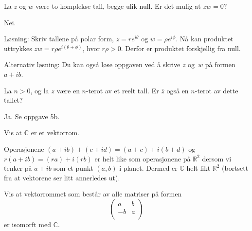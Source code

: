 \begin{oppgave}
La $z$ og $w$ være to komplekse tall, begge ulik null. Er det mulig at $zw=0$?
\end{oppgave}

\begin{losning}
Nei.

\noindent
Løsning: Skriv tallene på polar form, $z=re^{i\theta}$ og $w=\rho e^{i\phi}$. Nå kan produktet uttrykkes $zw=r\rho e^{i(\theta+\phi)}$, hvor $r \rho>0$. Derfor er produktet forskjellig fra null.

\noindent
Alternativ løsning: Du kan også løse oppgaven ved å skrive $z$ og~$w$ på formen $a+ib$.
\end{losning}



\begin{oppgave}
La $n>0$, og la $z$ være en $n$-terot av et reelt tall. Er $\bar{z}$ også en $n$-terot av dette tallet?
\end{oppgave}

\begin{losning}
Ja. Se oppgave 5b.

\end{losning}

\begin{oppgave}
Vis at $\mathbb C$ er et vektorrom.
\end{oppgave}

\begin{losning}
Operasjonene $(a+ib)+(c+id)=(a+c)+i(b+d)$ og $r(a+ib)=(ra)+i(rb)$ er helt like som operasjonene på $\mathbb{R}^2$ dersom vi tenker på $a+ib$ som et punkt $(a,b)$ i planet. Dermed er $\mathbb{C}$ helt likt $\mathbb{R}^2$ (bortsett fra at vektorene ser litt annerledes ut).
\end{losning}

\begin{oppgave}
Vis at vektorrommet som består av alle matriser på formen 
\[
\begin{pmatrix}
a & b \\
-b & a \\
\end{pmatrix}
\]
er isomorft med $\mathbb C$. 
\end{oppgave}

